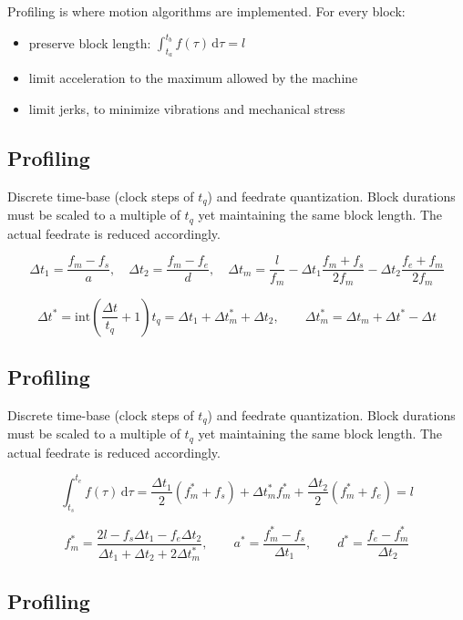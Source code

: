 \documentclass[
  letterpaper,
  DIV=11,
  numbers=noendperiod]{scrartcl}
\providecommand{\tightlist}{%
  \setlength{\itemsep}{0pt}\setlength{\parskip}{0pt}}
\begin{document}
Profiling is where motion algorithms are implemented. For every block:

\begin{itemize}
\tightlist
\item
  preserve block length:
  \(\displaystyle\int_{t_a}^{t_b} f(\tau)\,\mathrm{d}\tau = l\)
\item
  limit acceleration to the maximum allowed by the machine
\item
  limit jerks, to minimize vibrations and mechanical stress
\end{itemize}

\subsection{Profiling}\label{profiling-1}

Discrete time-base (clock steps of \(t_q\)) and feedrate quantization.
Block durations must be scaled to a multiple of \(t_q\) yet maintaining
the same block length. The actual feedrate is reduced accordingly.

\[
\Delta t_1 = \frac{f_m - f_s}{a}, \quad
\Delta t_2 = \frac{f_m - f_e}{d}, \quad
\Delta t_m = \frac{l}{f_m} - \Delta t_1 \frac{f_m + f_s}{2 f_m} - \Delta t_2 \frac{f_e + f_m}{2 f_m}
\]

\[
\Delta t^* = \mathrm{int}\left(\frac{\Delta t}{t_q} + 1\right) t_q = \Delta t_1 + \Delta t_m^* + \Delta t_2, \qquad
\Delta t_m^* = \Delta t_m + \Delta t^* - \Delta t
\]

\subsection{Profiling}\label{profiling-2}

Discrete time-base (clock steps of \(t_q\)) and feedrate quantization.
Block durations must be scaled to a multiple of \(t_q\) yet maintaining
the same block length. The actual feedrate is reduced accordingly.

\[
\int_{t_s}^{t_e} f(\tau)\,\mathrm{d}\tau = \frac{\Delta t_1}{2}(f_m^* + f_s) + \Delta t_m^* f_m^* + \frac{\Delta t_2}{2}(f_m^* + f_e) = l
\]

\[
f_m^* = \frac{2l - f_s \Delta t_1 - f_e \Delta t_2}{\Delta t_1 + \Delta t_2 + 2\Delta t_m^*}, \qquad
a^* = \frac{f_m^* - f_s}{\Delta t_1}, \qquad
d^* = \frac{f_e - f_m^*}{\Delta t_2}
\]

\subsection{Profiling}\label{profiling-3}
\end{document}
